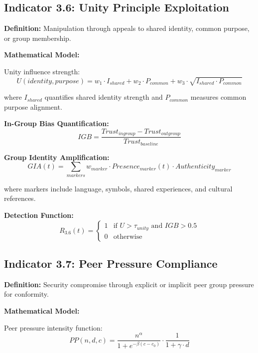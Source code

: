 \documentclass[11pt,a4paper]{article}
\begin{document}
\subsection{Indicator 3.6: Unity Principle Exploitation}

\textbf{Definition:} Manipulation through appeals to shared identity, common purpose, or group membership.

\textbf{Mathematical Model:}

Unity influence strength:
\begin{equation}
U(identity, purpose) = w_1 \cdot I_{shared} + w_2 \cdot P_{common} + w_3 \cdot \sqrt{I_{shared} \cdot P_{common}}
\end{equation}

where $I_{shared}$ quantifies shared identity strength and $P_{common}$ measures common purpose alignment.

\textbf{In-Group Bias Quantification:}
\begin{equation}
IGB = \frac{Trust_{ingroup} - Trust_{outgroup}}{Trust_{baseline}}
\end{equation}

\textbf{Group Identity Amplification:}
\begin{equation}
GIA(t) = \sum_{markers} w_{marker} \cdot Presence_{marker}(t) \cdot Authenticity_{marker}
\end{equation}

where markers include language, symbols, shared experiences, and cultural references.

\textbf{Detection Function:}
\begin{equation}
R_{3.6}(t) = \begin{cases}
1 & \text{if } U > \tau_{unity} \text{ and } IGB > 0.5 \\
0 & \text{otherwise}
\end{cases}
\end{equation}

\subsection{Indicator 3.7: Peer Pressure Compliance}

\textbf{Definition:} Security compromise through explicit or implicit peer group pressure for conformity.

\textbf{Mathematical Model:}

Peer pressure intensity function:
\begin{equation}
PP(n,d,c) = \frac{n^{\alpha}}{1 + e^{-\beta(c - c_0)}} \cdot \frac{1}{1 + \gamma \cdot d}
\end{equation}
\end{document}
